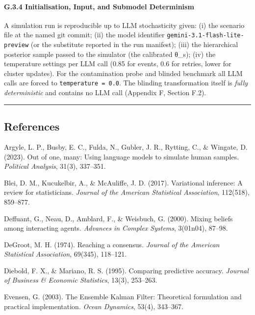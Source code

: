 \documentclass[
]{article}
\begin{document}
\paragraph{G.3.4 Initialisation, Input, and Submodel
Determinism}\label{g.3.4-initialisation-input-and-submodel-determinism}

A simulation run is reproducible up to LLM stochasticity given: (i) the
scenario file at the named git commit; (ii) the model identifier
\texttt{gemini-3.1-flash-lite-preview} (or the substitute reported in
the run manifest); (iii) the hierarchical posterior sample passed to the
simulator (the calibrated θ\_s); (iv) the temperature settings per LLM
call (0.85 for events, 0.6 for retries, lower for cluster updates). For
the contamination probe and blinded benchmark all LLM calls are forced
to \texttt{temperature\ =\ 0.0}. The blinding transformation itself is
\emph{fully deterministic} and contains no LLM call (Appendix F, Section
F.2).

\begin{center}\rule{0.5\linewidth}{0.5pt}\end{center}

\subsection{References}\label{references}

Argyle, L. P., Busby, E. C., Fulda, N., Gubler, J. R., Rytting, C., \&
Wingate, D. (2023). Out of one, many: Using language models to simulate
human samples. \emph{Political Analysis}, 31(3), 337--351.

Blei, D. M., Kucukelbir, A., \& McAuliffe, J. D. (2017). Variational
inference: A review for statisticians. \emph{Journal of the American
Statistical Association}, 112(518), 859--877.

Deffuant, G., Neau, D., Amblard, F., \& Weisbuch, G. (2000). Mixing
beliefs among interacting agents. \emph{Advances in Complex Systems},
3(01n04), 87--98.

DeGroot, M. H. (1974). Reaching a consensus. \emph{Journal of the
American Statistical Association}, 69(345), 118--121.

Diebold, F. X., \& Mariano, R. S. (1995). Comparing predictive accuracy.
\emph{Journal of Business \& Economic Statistics}, 13(3), 253--263.

Evensen, G. (2003). The Ensemble Kalman Filter: Theoretical formulation
and practical implementation. \emph{Ocean Dynamics}, 53(4), 343--367.
\end{document}
